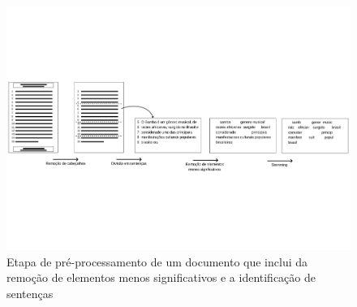 \begin{center}
	\begin{figure}[h!]

	\includegraphics[trim={ 0 180 0 180 },clip,page=1,width=\textwidth]{conteudo/capitulos/figs/pre-process.pdf}

	\caption{Etapa de pré-processamento de um documento que inclui da remoção de elementos menos significativos e a identificação de sentenças}
	\label{fig:preprocessamento-segmentacao}
	\end{figure}
\end{center}




